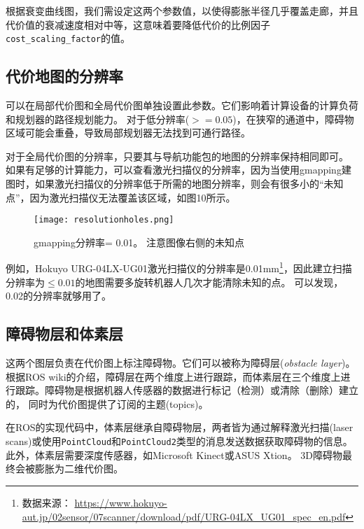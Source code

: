 根据衰变曲线图，我们需设定这两个参数值，以使得膨胀半径几乎覆盖走廊，并且代价值的衰减速度相对中等，这意味着要降低代价的比例因子\texttt{cost_scaling_factor}的值。

\subsection[costmap resolution]{代价地图的分辨率}%
可以在局部代价图和全局代价图单独设置此参数。它们影响着计算设备的计算负荷和规划器的路径规划能力。
对于低分辨率($>=0.05$)，在狭窄的通道中，障碍物区域可能会重叠，导致局部规划器无法找到可通行路径。

对于全局代价图的分辨率，只要其与导航功能包的地图的分辨率保持相同即可。
如果有足够的计算能力，可以查看激光扫描仪的分辨率，因为当使用gmapping建图时，如果激光扫描仪的分辨率低于所需的地图分辨率，则会有很多小的“未知点”，因为激光扫描仪无法覆盖该区域，如图10所示。


\begin{figure}[!h]
	\begin{center}
		\texttt{[image: resolutionholes.png]}
		\caption{gmapping分辨率= 0.01。 注意图像右侧的未知点}
	\end{center}
\end{figure}

例如，Hokuyo URG-04LX-UG01激光扫描仪的分辨率是0.01mm\footnote{数据来源： \url{https://www.hokuyo-aut.jp/02sensor/07scanner/download/pdf/URG-04LX_UG01_spec_en.pdf}}，因此建立扫描分辨率为$\leq 0.01$的地图需要多旋转机器人几次才能清除未知的点。
可以发现，0.02的分辨率就够用了。

\subsection[obstacle layer and voxel layer]{障碍物层和体素层}
这两个图层负责在代价图上标注障碍物。它们可以被称为障碍层(\textit{obstacle layer})。根据ROS wiki的介绍，障碍层在两个维度上进行跟踪，而体素层在三个维度上进行跟踪。障碍物是根据机器人传感器的数据进行标记（检测）或清除（删除）建立的，
同时为代价图提供了订阅的主题(topics)。

在ROS的实现代码中，体素层继承自障碍物层，两者皆为通过解释激光扫描(laser scans)或使用\texttt{PointCloud}和\texttt{PointCloud2}类型的消息发送数据获取障碍物的信息。 此外，体素层需要深度传感器，如Microsoft Kinect或ASUS Xtion。 3D障碍物最终会被膨胀为二维代价图。

